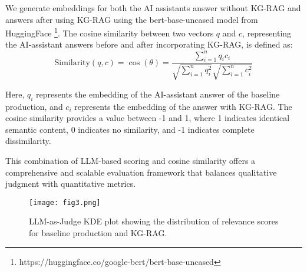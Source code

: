 We generate embeddings for both the AI assistants answer without KG-RAG and answers after using KG-RAG using the bert-base-uncased model from HuggingFace \footnote{https://huggingface.co/google-bert/bert-base-uncased}. The cosine similarity between two vectors \( q \) and \( c \), representing the AI-assistant answers before and after incorporating KG-RAG, is defined as:
 \vspace*{-1mm}
\begin{equation}    
\text{Similarity}(q, c) = \cos(\theta) = \frac{\sum_{i=1}^{n} q_i c_i}{\sqrt{\sum_{i=1}^{n} q_i^2} \sqrt{\sum_{i=1}^{n} c_i^2}}
\label{cosine}
\end{equation}

Here, \( q_i \) represents the embedding of the AI-assistant answer of the baseline production, and \( c_i \) represents the embedding of the answer with KG-RAG. The cosine similarity provides a value between -1 and 1, where 1 indicates identical semantic content, 0 indicates no similarity, and -1 indicates complete dissimilarity.






This combination of LLM-based scoring and cosine similarity offers a comprehensive and scalable evaluation framework that balances qualitative judgment with quantitative metrics.

\begin{figure}[h]
    
    \texttt{[image: fig3.png]} 
    \vspace{-2em}
    \caption{LLM-as-Judge KDE plot showing the distribution of relevance scores for baseline production and KG-RAG.}
    \vspace{-2.0em}
    \label{fig:kde}
\end{figure}